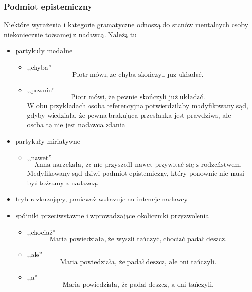 \documentclass[12pt]{mwart}
\theoremstyle{remark}
\begin{document}
\subsubsection{Podmiot epistemiczny}
Niektóre wyrażenia i kategorie gramatyczne odnoszą do stanów mentalnych osoby niekoniecznie tożsamej z nadawcą. Należą tu
\begin{itemize}

\item partykuły modalne

	\begin{itemize}
	\item ,,chyba''
	\begin{equation}
		\text{Piotr mówi, że chyba skończyli już układać.}
	\end{equation}
	\item ,,pewnie''
	\begin{equation}
		\text{Piotr mówi, że pewnie skończyli już układać.}
	\end{equation}
	W obu przykładach osoba referencyjna potwierdziłaby modyfikowany sąd, gdyby wiedziała, że pewna brakująca przesłanka jest prawdziwa, ale osoba tą nie jest nadawca zdania.
	\end{itemize}

\item partykuły miriatywne

	\begin{itemize}
	\item ,,nawet''
	\begin{equation}
		\text{Anna narzekała, że nie przyszedł nawet przywitać się z rodzeństwem.}
	\end{equation}
	Modyfikowany sąd dziwi podmiot epistemiczny, który ponownie nie musi być tożsamy z nadawcą.
	\end{itemize}

\item tryb rozkazujący, ponieważ wskazuje na intencje nadawcy
\item spójniki przeciwstawne i wprowadzające okoliczniki przyzwolenia
	\begin{itemize}
		\item ,,chociaż''
		\begin{equation}
			\text{Maria powiedziała, że wyszli tańczyć, chociać padał deszcz.}
		\end{equation}
		\item ,,ale''
		\begin{equation}
			\text{Maria powiedziała, że padał deszcz, ale oni tańczyli.}
		\end{equation}
		\item ,,a''
		\begin{equation}
			\text{Maria powiedziała, że padał deszcz, a oni tańczyli.}
		\end{equation}
	\end{itemize}

\end{itemize}
\end{document}
